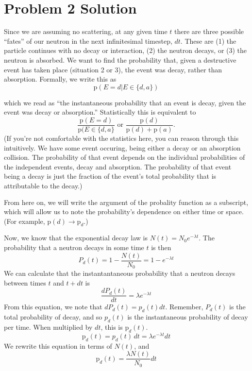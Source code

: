 \documentclass{report}
\begin{document}
\section*{Problem 2 Solution}

Since we are assuming no scattering, at any given time $t$ there are three possible ``fates'' of our neutron in the next infinitesimal timestep, $dt$. These are (1) the particle continues with no decay or interaction, (2) the neutron decays, or (3) the neutron is absorbed. We want to find the probability that, given a destructive event has taken place (situation 2 or 3), the event was decay, rather than absorption. Formally, we write this as 
$$ \text{p}(E=d | E \in \{d,a\}) $$

which we read as ``the instantaneous probability that an event is decay, given the event was decay or absorption.'' Statistically this is equivalent to
\begin{equation}
\label{prob}
\frac{\text{p}(E=d)}{\text{p}(E \in \{d,a\}} \text{ or } \frac{\text{p}(d)}{\text{p}(d) + \text{p}(a)}.
\end{equation}
(If you're not comfortable with the statistics here, you can reason through this intuitively. We have some event occuring, being either a decay or an absorption collision. The probability of that event depends on the individual probabilities of the independent events, decay and absorption. The probability of that event being a decay is just the fraction of the event's total probability that is attributable to the decay.)

From here on, we will write the argument of the probality function as a subscript, which will allow us to note the probability's dependence on either time or space. (For example, $\text{p}(d) \rightarrow \text{p}_d$.)

Now, we know that the exponential decay law is $N(t) = N_0 e^{-\lambda t}$. The probability that a neutron decays in some time $t$ is then
$$ P_d(t) = 1-\frac{N(t)}{N_0} = 1-e^{-\lambda t} $$
We can calculate that the instantantaneous probability that a neutron decays between times $t$ and $t+dt$ is 
$$ \frac{dP_d(t)}{dt} = \lambda e^{-\lambda t} $$
From this equation, we note that $dP_d(t) = p_d(t)dt$. Remember, $P_d(t)$ is the total probability of decay, and so $p_d(t)$ is the instantaneous probability of decay per time. When multiplied by $dt$, this is $\text{p}_d(t)$.
$$ \text{p}_d(t) = p_d(t) \, dt = \lambda e^{-\lambda t} dt $$
We rewrite this equation in terms of $N(t)$, and  
$$ \text{p}_d(t) = \frac{\lambda N(t)}{N_0} dt$$
\end{document}

